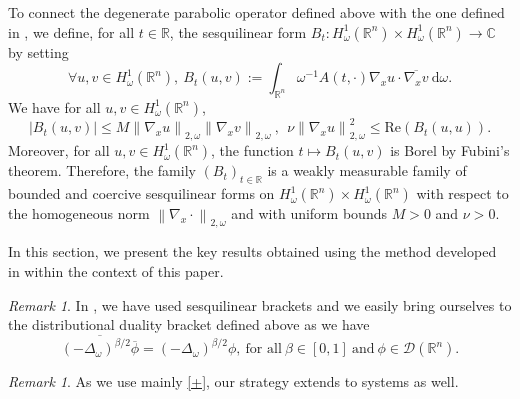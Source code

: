 \documentclass[12pt, letterpaper]{amsart}
\theoremstyle{definition}
\theoremstyle{remark}
\newtheorem{rem}[thm]{Remark}
\numberwithin{equation}{section}
\begin{document}
To connect the degenerate parabolic operator defined above with the one defined in \cite[Section 6]{auscher2024fundamental}, we define, for all $t \in \mathbb{R}$, the sesquilinear form $B_t : H^1_\omega(\mathbb{R}^n) \times H^1_\omega(\mathbb{R}^n) \rightarrow \mathbb{C}$ by setting
\begin{equation*}
   \forall u,v \in H^1_\omega(\mathbb{R}^n) , \  B_t(u,v):=  \int_{\mathbb{R}^{n}} \omega ^{-1}A(t,\cdot)\nabla_xu \cdot \overline{\nabla_x v} \ \mathrm d \omega. 
\end{equation*}
We have for all $u, v \in  H^1_\omega(\mathbb{R}^n)$,
\begin{equation}\label{+}
     \left | B_t(u,v) \right |\leq M \left \| \nabla_x u \right \|_{2,\omega}\left \| \nabla_x v \right \|_{2,\omega}\ ,\ \  \nu \left \| \nabla_x u \right \|_{2,\omega}^2 \leq \mathrm{Re} (B_t(u,u)).
\end{equation}
Moreover, for all $u,v \in H^1_{\omega}(\mathbb{R}^n)$, the function $t \mapsto B_t(u,v)$ is Borel by Fubini's theorem. Therefore, the family $(B_t)_{t\in \mathbb{R}}$ is a weakly measurable family of bounded and coercive sesquilinear forms on $H^1_{\omega}(\mathbb{R}^n) \times H^1_{\omega}(\mathbb{R}^n)$ with respect to the homogeneous norm $\left \| \nabla_x \cdot \right \|_{2,\omega}$ and with uniform bounds $M>0$ and $\nu >0$. 

In this section, we present the key results obtained using the method developed in \cite{auscher2024fundamental} within the context of this paper.
\begin{rem}
   In \cite{auscher2024fundamental}, we have used sesquilinear brackets and we easily bring ourselves to the distributional duality bracket defined above as we have
$$\overline{(-\Delta_\omega)^{\beta/2} \overline{\phi}}=(-\Delta_\omega)^{\beta/2} \phi, \  \text{for all} \ \beta \in [0,1] \ \text{and} \ \phi \in \mathcal{D}(\mathbb{R}^n).$$
\end{rem}
\begin{rem}
    As we use mainly \eqref{+}, our strategy extends to systems as well. 
\end{rem}
\end{document}
